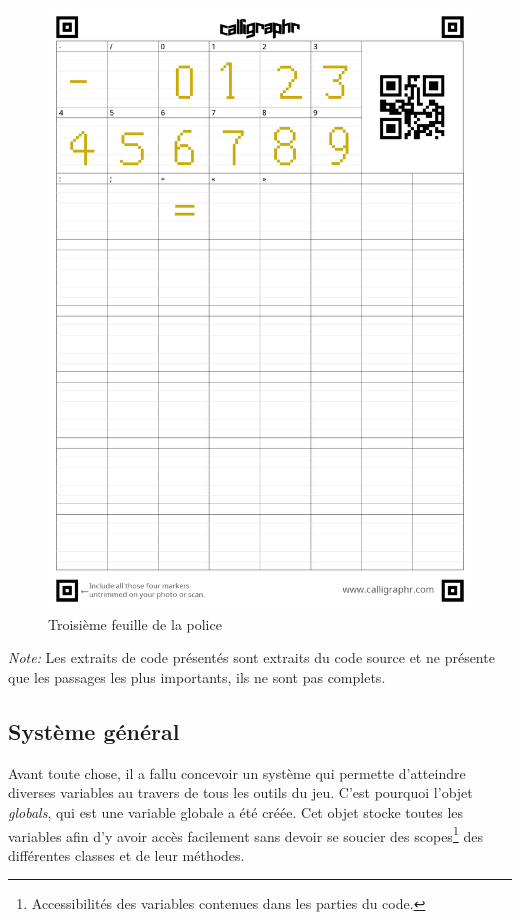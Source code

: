 \documentclass[11pt]{article}
\begin{document}
\begin{appendices}
\begin{figure}[H]
\includegraphics[scale=0.2]{fontPage3}
\caption{Troisième feuille de la police}
\end{figure}

\newpage
\textit{Note:} Les extraits de code présentés sont extraits du code source et ne présente que les passages les plus importants, ils ne sont pas complets.

\subsection{Système général}
	Avant toute chose, il a fallu concevoir un système qui permette d'atteindre diverses variables au travers de tous les outils du jeu. C'est pourquoi l'objet \textit{globals}, qui est une variable globale a été créée. Cet objet stocke toutes les variables afin d'y avoir accès facilement sans devoir se soucier des scopes\footnote{Accessibilités des variables contenues dans les parties du code.} des différentes classes et de leur méthodes.\\
 

\end{appendices}
\end{document}
